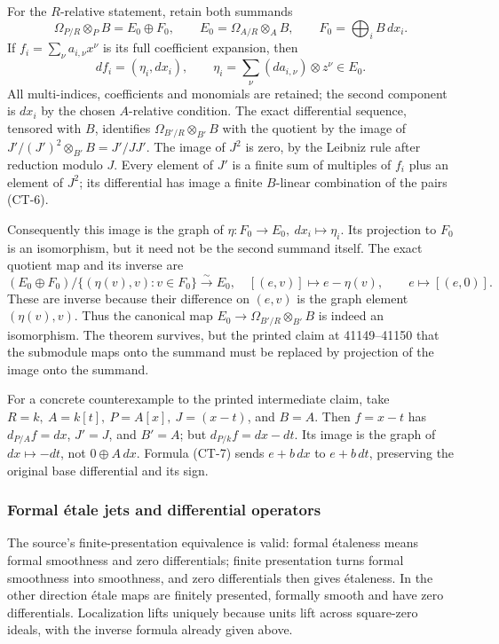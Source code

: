 For the \(R\)-relative statement, retain both summands \[
\Omega_{P/R}\otimes_PB=E_0\oplus F_0,\qquad
E_0=\Omega_{A/R}\otimes_AB,\qquad F_0=\bigoplus_iB\,dx_i.
\] If \(f_i=\sum_\nu a_{i,\nu}x^\nu\) is its full coefficient expansion, then \[
df_i=(\eta_i,dx_i),\qquad
\eta_i=\sum_\nu(da_{i,\nu})\otimes z^\nu\in E_0.
\tag{CT-6}
\] All multi-indices, coefficients and monomials are retained; the second component is \(dx_i\) by the chosen \(A\)-relative condition. The exact differential sequence, tensored with \(B\), identifies \(\Omega_{B'/R}\otimes_{B'}B\) with the quotient by the image of \(J'/(J')^2\otimes_{B'}B=J'/JJ'\). The image of \(J^2\) is zero, by the Leibniz rule after reduction modulo \(J\). Every element of \(J'\) is a finite sum of multiples of \(f_i\) plus an element of \(J^2\); its differential has image a finite \(B\)-linear combination of the pairs (CT-6).

Consequently this image is the graph of \(\eta:F_0\to E_0,\ dx_i\mapsto\eta_i\). Its projection to \(F_0\) is an isomorphism, but it need not be the second summand itself. The exact quotient map and its inverse are \[
(E_0\oplus F_0)/\{(\eta(v),v):v\in F_0\}
\xrightarrow{\sim}E_0,\quad [(e,v)]\mapsto e-\eta(v),
\qquad e\mapsto[(e,0)].
\tag{CT-7}
\] These are inverse because their difference on \((e,v)\) is the graph element \((\eta(v),v)\). Thus the canonical map \(E_0\to\Omega_{B'/R}\otimes_{B'}B\) is indeed an isomorphism. The theorem survives, but the printed claim at 41149--41150 that the submodule maps onto the summand must be replaced by projection of the image onto the summand.

For a concrete counterexample to the printed intermediate claim, take \(R=k,\ A=k[t],\ P=A[x],\ J=(x-t)\), and \(B=A\). Then \(f=x-t\) has \(d_{P/A}f=dx\), \(J'=J\), and \(B'=A\); but \(d_{P/k}f=dx-dt\). Its image is the graph of \(dx\mapsto-dt\), not \(0\oplus A\,dx\). Formula (CT-7) sends \(e+b\,dx\) to \(e+b\,dt\), preserving the original base differential and its sign.

\subsubsection{Formal étale jets and differential operators}\label{formal-uxe9tale-jets-and-differential-operators}

The source's finite-presentation equivalence is valid: formal étaleness means formal smoothness and zero differentials; finite presentation turns formal smoothness into smoothness, and zero differentials then gives étaleness. In the other direction étale maps are finitely presented, formally smooth and have zero differentials. Localization lifts uniquely because units lift across square-zero ideals, with the inverse formula already given above.

